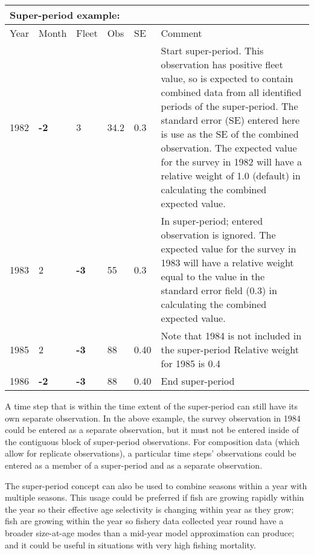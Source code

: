 \begin{center}
	\begin{tabular}{p{1cm} p{1cm} p{1cm} p{1cm} p{1cm} p{9cm}}
		\multicolumn{6}{l}{Super-period example:}\\
		\hline
		Year & Month & Fleet & Obs & SE & Comment \Tstrut\Bstrut\\
		\hline
		1982 \Tstrut & \textbf{-2} & 3 & 34.2 & 0.3 & Start super-period.  This observation has positive fleet value, so is expected to contain combined data from all identified periods of the super-period. The standard error (SE) entered here is use as the SE of the combined observation.  The expected value for the survey in 1982 will have a relative weight of 1.0 (default) in calculating the combined expected value.\Bstrut\\
		\hline
		1983 \Tstrut & 2 & \textbf{-3} & 55 & 0.3 & In super-period; entered observation is ignored.  The expected value for the survey in 1983 will have a relative weight equal to the value in the standard error field (0.3) in calculating the combined expected value.\Bstrut\\
		\hline
		1985 \Tstrut & 2 & \textbf{-3}& 88 & 0.40 & Note that 1984 is not included in the super-period  Relative weight for 1985 is 0.4\Bstrut\\
		\hline
		1986 & \textbf{-2} & \textbf{-3} & 88 & 0.40 & End super-period\Tstrut\Bstrut\\
		\hline
	\end{tabular}
\end{center}

A time step that is within the time extent of the super-period can still have its own separate observation. In the above example, the survey observation in 1984 could be entered as a separate observation, but it must not be entered inside of the contiguous block of super-period observations. For composition data (which allow for replicate observations), a particular time steps' observations could be entered as a member of a super-period and as a separate observation.

The super-period concept can also be used to combine seasons within a year with multiple seasons. This usage could be preferred if fish are growing rapidly within the year so their effective age selectivity is changing within year as they grow; fish are growing within the year so fishery data collected year round have a broader size-at-age modes than a mid-year model approximation can produce; and it could be useful in situations with very high fishing mortality.

\pagebreak
